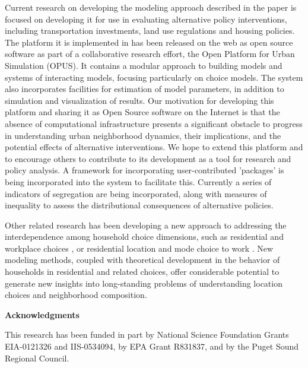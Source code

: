 \documentclass[12pt,a4paper]{article}
\begin{document}
Current research on developing the modeling approach described in the paper
is focused on developing it for use in
evaluating alternative policy interventions, including
transportation investments, land use regulations and housing
policies.  The platform it is implemented in has been released on
the web as open source software as part of a collaborative 
research effort, the Open Platform for Urban Simulation
(OPUS)\cite{waddell-opus-2005}.  It contains a modular approach to building
models and systems of interacting models, focusing particularly on choice models.
The system also incorporates facilities for estimation of model parameters, in
addition to simulation and visualization of results.  Our motivation
for developing this platform and sharing it as Open Source software on the Internet is
that the absence of computational infrastructure presents a significant obstacle to 
progress in understanding urban neighborhood dynamics, their implications, and the 
potential effects of alternative interventions.  We hope to extend this 
platform and to encourage others to contribute to its development as a tool for 
research and policy analysis.  A framework for incorporating user-contributed 
'packages' is being incorporated into the system to facilitate this.  Currently a
series of indicators of segregation are being incorporated, along with measures
of inequality to assess the distributional consequences of alternative policies.

Other related research has been developing a new approach to addressing the 
interdependence among household choice dimensions, such as residential and workplace
choices \cite{waddell-trr-2007}, or residential location and mode choice to work 
\cite{pinjari-transportation-2007}.
New modeling methods, coupled with theoretical development in the behavior of households
in residential and related choices, offer considerable potential to generate new insights into 
long-standing problems of understanding location choices and neighborhood composition.


\vspace{1cm} {\bf \large Acknowledgments}

This research has been funded in part by National Science Foundation
Grants EIA-0121326 and IIS-0534094, by EPA Grant R831837, 
and by the Puget Sound Regional Council.

\vspace{1cm}



\end{document}
